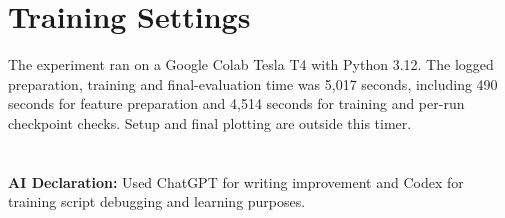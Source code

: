 \documentclass[11pt]{article}
\begin{document}
\section*{Training Settings}
The experiment ran on a Google Colab Tesla T4 with Python 3.12. The logged preparation, training and final-evaluation time was
5,017 seconds, including 490 seconds for
feature preparation and 4,514 seconds for training and
per-run checkpoint checks. Setup and final plotting are outside this timer.

\section*{}
\textbf{AI Declaration:} Used ChatGPT for writing improvement and Codex for training script debugging and learning purposes.
\end{document}
